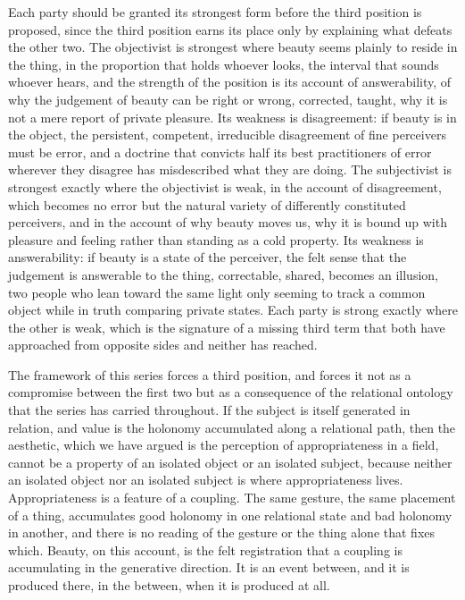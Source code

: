 Each party should be granted its strongest form before the third position is proposed, since the third position earns its place only by explaining what defeats the other two. The objectivist is strongest where beauty seems plainly to reside in the thing, in the proportion that holds whoever looks, the interval that sounds whoever hears, and the strength of the position is its account of answerability, of why the judgement of beauty can be right or wrong, corrected, taught, why it is not a mere report of private pleasure. Its weakness is disagreement: if beauty is in the object, the persistent, competent, irreducible disagreement of fine perceivers must be error, and a doctrine that convicts half its best practitioners of error wherever they disagree has misdescribed what they are doing. The subjectivist is strongest exactly where the objectivist is weak, in the account of disagreement, which becomes no error but the natural variety of differently constituted perceivers, and in the account of why beauty moves us, why it is bound up with pleasure and feeling rather than standing as a cold property. Its weakness is answerability: if beauty is a state of the perceiver, the felt sense that the judgement is answerable to the thing, correctable, shared, becomes an illusion, two people who lean toward the same light only seeming to track a common object while in truth comparing private states. Each party is strong exactly where the other is weak, which is the signature of a missing third term that both have approached from opposite sides and neither has reached.

The framework of this series forces a third position, and forces it not as a compromise between the first two but as a consequence of the relational ontology that the series has carried throughout. If the subject is itself generated in relation, and value is the holonomy accumulated along a relational path, then the aesthetic, which we have argued is the perception of appropriateness in a field, cannot be a property of an isolated object or an isolated subject, because neither an isolated object nor an isolated subject is where appropriateness lives. Appropriateness is a feature of a coupling. The same gesture, the same placement of a thing, accumulates good holonomy in one relational state and bad holonomy in another, and there is no reading of the gesture or the thing alone that fixes which. Beauty, on this account, is the felt registration that a coupling is accumulating in the generative direction. It is an event between, and it is produced there, in the between, when it is produced at all.

